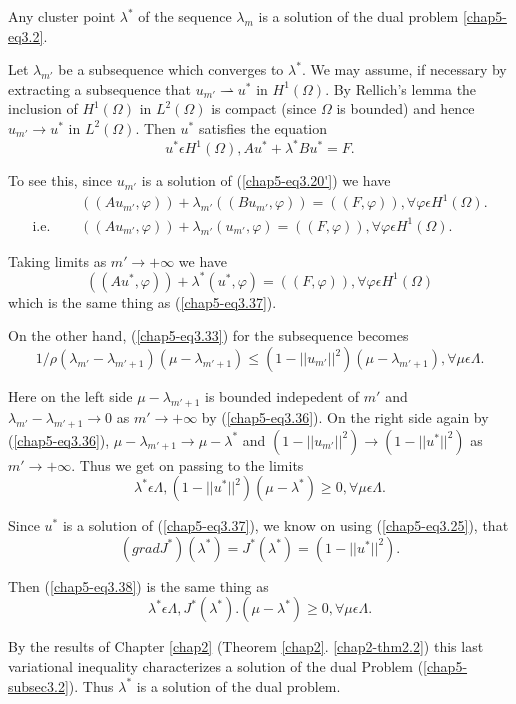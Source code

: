 \begin{step}\label{chap5-step4}
Any cluster point $\lambda^{*}$ of the sequence $\lambda_{m}$ is a solution of the dual problem \ref{chap5-eq3.2}.

Let $\lambda_{m'}$ be a subsequence which converges to $\lambda^{*}$. We may assume, if necessary by extracting a subsequence that $u_{m'} \rightharpoonup u^{*}$ in $H^{1} (\Omega)$. By Rellich's lemma the inclusion of $H^{1}(\Omega)$ in $L^{2}(\Omega)$ is compact (since $\Omega$ is bounded) and hence $u_{m'} \to u^{*}$ in $L^{2} (\Omega)$. Then $u^{*}$ satisfies the equation
\begin{equation*}
u^{*} \epsilon H^{1}(\Omega), Au^{*} + \lambda^{*} Bu^{*} = F.\tag{3.37}\label{chap5-eq3.37}
\end{equation*}

To see this, since $u_{m'}$ is a solution of (\ref{chap5-eq3.20'}) we have
\begin{align*}
& ((A u_{m'}, \varphi)) + \lambda_{m'} ((B u_{m'}, \varphi)) = ((F, \varphi)), \forall \varphi \epsilon H^{1}(\Omega).\\
\text{i.e. }\quad & ((A u_{m'}, \varphi)) + \lambda_{m'} (u_{m'}, \varphi) = ((F, \varphi)), \forall \varphi \epsilon H^{1}(\Omega).
\end{align*}

Taking limits as $m' \to + \infty$ we have
$$
((Au^{*}, \varphi)) + \lambda^{*} (u^{*}, \varphi) = ((F, \varphi)), \forall \varphi \epsilon H^{1}(\Omega)
$$\pageoriginale
which is the same thing as (\ref{chap5-eq3.37}).

On the other hand, (\ref{chap5-eq3.33}) for the subsequence becomes 
$$
1/ \rho (\lambda_{m'} -\lambda_{m'+1}) (\mu - \lambda_{m'+1}) \leq (1 - ||u_{m'}||^{2}) (\mu - \lambda_{m'+1}), \forall \mu \epsilon \Lambda.
$$

Here on the left side $\mu -\lambda_{m'+1}$ is bounded indepedent of $m'$ and $\lambda_{m'} - \lambda_{m'+1} \to 0$ as $m' \to + \infty$ by (\ref{chap5-eq3.36}). On the right side again by (\ref{chap5-eq3.36}), $\mu - \lambda_{m'+1} \to \mu - \lambda^{*}$ and $(1 - ||u_{m'}||^{2}) \to (1 - ||u^{*}||^{2})$ as $m' \to + \infty$. Thus we get on passing to the limits
\begin{equation*}
\lambda^{*} \epsilon \Lambda, (1 - ||u^{*}||^{2}) (\mu - \lambda^{*}) \geq 0, \forall \mu \epsilon \Lambda.\tag{3.38}\label{chap5-eq3.38}
\end{equation*}

Since $u^{*}$ is a solution of (\ref{chap5-eq3.37}), we know on using (\ref{chap5-eq3.25}), that
$$
(grad J^{*}) (\lambda^{*}) = J^{*} (\lambda^{*}) = (1 - ||u^{*}||^{2}).
$$

Then (\ref{chap5-eq3.38}) is the same thing as
$$
\lambda^{*} \epsilon \Lambda, J^{*}(\lambda^{*}). (\mu - \lambda^{*}) \geq 0, \forall \mu \epsilon \Lambda.
$$

By the results of Chapter \ref{chap2} (Theorem \ref{chap2}. \ref{chap2-thm2.2}) this last variational inequality characterizes a solution of the dual Problem (\ref{chap5-subsec3.2}). Thus $\lambda^{*}$ is a solution of the dual problem.
\end{step}


